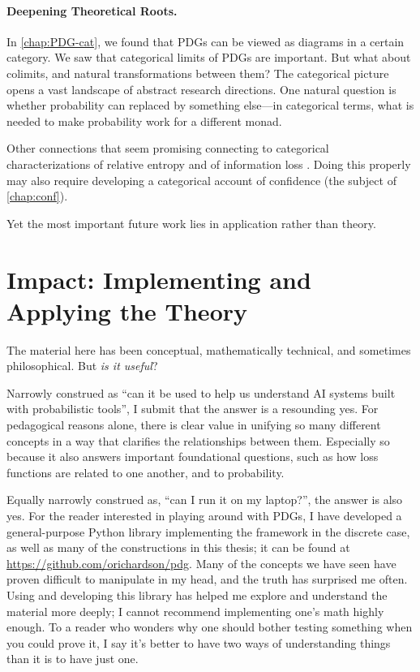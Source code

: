 \paragraph{Deepening Theoretical Roots.}
% 
In \cref{chap:PDG-cat}, we found that PDGs can be viewed as diagrams in a certain category. 
We saw that categorical limits of PDGs are important. But what about colimits, and natural transformations between them? 
The categorical picture opens a vast landscape of abstract research directions.
One natural question is whether probability can replaced by something else---in categorical terms, what is needed to make probability work for a different monad.

Other connections that seem promising connecting to categorical characterizations of relative entropy \citep{baez2014bayesiancharacterizationrelativeentropy} 
and of information loss \citep[Theorem 12.4.9]{leinster2021entropy}.
Doing this properly may also require developing a categorical account of confidence (the subject of \cref{chap:conf}). 

Yet the most important future work lies in application rather than theory.

\section{Impact: Implementing and Applying the Theory}

The material here has been conceptual, mathematically technical, and sometimes philosophical.
But \emph{is it useful}?

Narrowly construed as ``can it be used to help us understand AI systems built with probabilistic tools'', I submit that the answer is a resounding yes. 
For pedagogical reasons alone, there is clear value in unifying so many different concepts in a way that clarifies the relationships between them.
Especially so because it also answers important foundational questions, such as how loss functions are related to one another, and to probability.

Equally narrowly construed as, ``can I run it on my laptop?'', the answer is also yes. 
For the reader interested in playing around with PDGs, I have developed a general-purpose Python library implementing the framework in the discrete case, as well as many of the constructions in this thesis;
it can be found at \url{https://github.com/orichardson/pdg}.
%
Many of the concepts we have seen have proven difficult to manipulate in my head, and the truth has surprised me often.
Using and developing this library has helped me explore and understand the material more deeply; I cannot recommend implementing one's math highly enough. 
To a reader who wonders why one should bother testing something when you could prove it, I say it's better to have two ways of understanding things than it is to have just one. 

